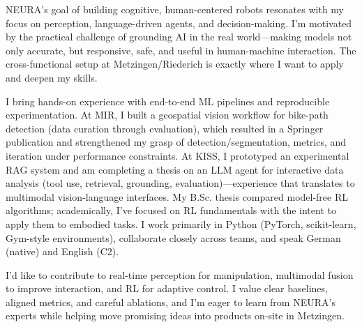 NEURA’s goal of building cognitive, human-centered robots resonates with my focus on perception, language-driven agents, and decision-making. I’m motivated by the practical challenge of grounding AI in the real world—making models not only accurate, but responsive, safe, and useful in human-machine interaction. The cross-functional setup at Metzingen/Riederich is exactly where I want to apply and deepen my skills.

I bring hands-on experience with end-to-end ML pipelines and reproducible experimentation. At MIR, I built a geospatial vision workflow for bike-path detection (data curation through evaluation), which resulted in a Springer publication and strengthened my grasp of detection/segmentation, metrics, and iteration under performance constraints. At KISS, I prototyped an experimental RAG system and am completing a thesis on an LLM agent for interactive data analysis (tool use, retrieval, grounding, evaluation)—experience that translates to multimodal vision-language interfaces. My B.Sc. thesis compared model-free RL algorithms; academically, I’ve focused on RL fundamentals with the intent to apply them to embodied tasks. I work primarily in Python (PyTorch, scikit-learn, Gym-style environments), collaborate closely across teams, and speak German (native) and English (C2).

I’d like to contribute to real-time perception for manipulation, multimodal fusion to improve interaction, and RL for adaptive control. I value clear baselines, aligned metrics, and careful ablations, and I’m eager to learn from NEURA’s experts while helping move promising ideas into products on-site in Metzingen.